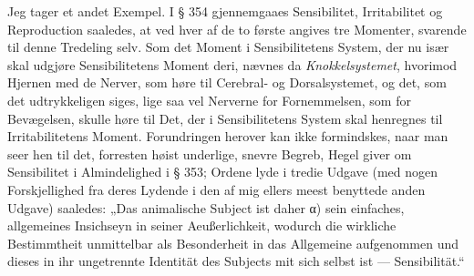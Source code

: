 \documentclass[12pt,a4paper]{book}
\newcommand{\apage}[1]{\marginnote{\footnotesize\textit{[#1]}}}
\begin{document}
Jeg tager et andet Exempel. I § 354 gjennemgaaes Sensibilitet, Irritabilitet
og Reproduction saaledes, at ved hver af de to første angives tre Momenter,
svarende til denne Tredeling selv. Som det Moment i Sensibilitetens System,
der nu især skal udgjøre Sensibilitetens Moment deri, nævnes da
\emph{Knokkelsystemet}, hvorimod Hjernen med de Nerver, som høre til Cerebral- og
Dorsalsystemet, og det, som det udtrykkeligen siges, lige saa vel Nerverne
for Fornemmelsen, som for Bevægelsen, skulle høre til Det, der i
Sensibilitetens System skal henregnes til Irritabilitetens Moment.
Forundringen herover kan ikke formindskes, naar man seer hen til det,
forresten høist underlige, snevre Begreb, Hegel giver om Sensibilitet i
Almindelighed i § 353; Ordene lyde i tredie Udgave (med nogen Forskjellighed
fra deres Lydende i den af \apage{23} mig ellers meest benyttede anden Udgave)
saaledes: „Das animalische Subject ist daher α) sein einfaches, allgemeines
Insichseyn in seiner Aeußerlichkeit, wodurch die wirkliche Bestimmtheit
unmittelbar als Besonderheit in das Allgemeine aufgenommen und dieses in ihr
ungetrennte Identität des Subjects mit sich selbst ist --- Sensibilität.“
\end{document}
